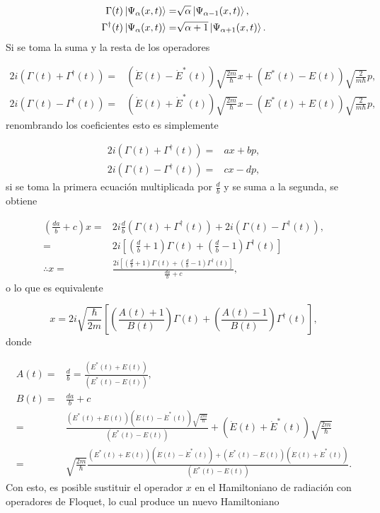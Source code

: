 \documentclass[10pt,a4paper]{report}
\begin{document}
\begin{align*}
\Gamma(t) \Ket{\Psi_\alpha (x,t)} =& \sqrt{\alpha}\Ket{\Psi_{\alpha-1} (x,t)}, \\
\Gamma^\dagger(t) \Ket{\Psi_\alpha (x,t)} =& \sqrt{\alpha+1}\Ket{\Psi_{\alpha+1} (x,t)}.
\end{align*}Si se toma la suma y la resta de los operadores

\begin{align*}
2i(\Gamma (t) + \Gamma ^\dagger (t)) =& (\dot{E} (t) - \dot{E}^* (t)) \sqrt{\frac{2m}{\hbar}}x + (E^* (t) - E (t))\sqrt{\frac{2}{m\hbar}} p, \\
2i(\Gamma (t) - \Gamma ^\dagger (t)) =& (\dot{E} (t) + \dot{E}^* (t)) \sqrt{\frac{2m}{\hbar}}x -(E^* (t) + E (t))\sqrt{\frac{2}{m\hbar}} p,
\end{align*} renombrando los coeficientes esto es simplemente

\begin{align*}
2i(\Gamma (t) + \Gamma ^\dagger (t)) =& ax + bp, \\
2i(\Gamma (t) - \Gamma ^\dagger (t)) =& cx - dp,
\end{align*} si se toma la primera ecuación multiplicada por $\frac{d}{b}$ y se suma a la segunda, se obtiene

\begin{align*}
(\frac{da}{b}+c)x =& 2i \frac{d}{b}(\Gamma (t) + \Gamma ^\dagger (t)) + 2i(\Gamma (t) - \Gamma ^\dagger (t)), \\
=&2i[(\frac{d}{b}+1)\Gamma (t)+(\frac{d}{b}-1)\Gamma^\dagger (t)]\\
\therefore x =& \frac{2i[(\frac{d}{b}+1)\Gamma (t)+(\frac{d}{b}-1)\Gamma^\dagger (t)]}{\frac{da}{b}+c},
\end{align*} o lo que es equivalente

\begin{equation}
x = 2i \sqrt{\frac{\hbar}{2m}}[(\frac{A(t) +1}{B(t)})\Gamma (t) +(\frac{A(t) -1}{B(t)})\Gamma^\dagger (t)],
\end{equation} donde

\begin{align}
A(t) =& \frac{d}{b} = \frac{(E^* (t) + E (t))}{(E^* (t) - E (t))}, \\
B(t) = & \frac{da}{b}+c \\
=& \frac{(E^* (t) + E (t))(\dot{E} (t) - \dot{E}^* (t)) \sqrt{\frac{2m}{\hbar}}}{(E^* (t) - E (t))} + (\dot{E} (t) + \dot{E}^* (t)) \sqrt{\frac{2m}{\hbar}}\\
=&\sqrt{\frac{2m}{\hbar}}\frac{(E^* (t) + E (t))(\dot{E} (t) - \dot{E}^* (t))+(E^* (t) - E (t))(\dot{E} (t) + \dot{E}^* (t))}{(E^* (t) - E (t))}.
\end{align}Con esto, es posible sustituir el operador $x$ en el Hamiltoniano de radiación con operadores de Floquet, lo cual produce un nuevo Hamiltoniano\cite{TesisMaestria}
\end{document}
